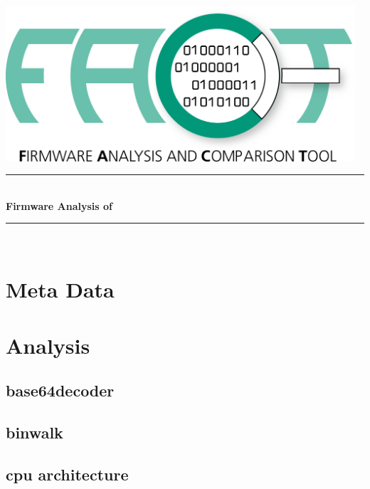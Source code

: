 \documentclass{article}
\begin{document}
\begin{titlepage}

\newcommand{\HRule}{\rule{\linewidth}{0.5mm}}

\center

\includegraphics[width = 13cm]{fact_logo.png}\\[3cm]

\HRule \\[0.4cm]
{\selectfont
{\Large \bfseries Firmware Analysis of }\\[0.4cm]
}
\HRule \\[1.5cm]

\vfill
\end{titlepage}

\section*{Meta Data}
{\selectfont

}

\section*{Analysis}

\subsection*{base64decoder}
{\selectfont

}

\subsection*{binwalk}
{\selectfont

}

\subsection*{cpu architecture}
{\selectfont

}
\end{document}
